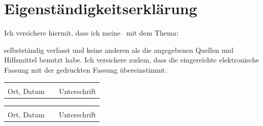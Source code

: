\section*{Eigenständigkeitserklärung}

\vspace{30pt}

\begin{flushleft}

Ich versichere hiermit, dass ich meine \artDerArbeit\ mit dem Thema: 

\textbf{\titel}

selbstständig verfasst und keine anderen als die angegebenen Quellen und Hilfsmittel benutzt habe. Ich versichere zudem, dass die eingereichte elektronische Fassung mit der gedruckten Fassung übereinstimmt.

\end{flushleft}


\vspace{30pt}


\begin{flushleft}
  \begin{tabular}{@{}p{6cm}p{1cm}p{6cm}@{}}
    \hrulefill & & \hrulefill \\
    \small Ort, Datum & & \small Unterschrift
  \end{tabular}
  \vspace{1em}
\end{flushleft}

\begin{flushleft}
  \begin{tabular}{@{}p{6cm}p{1cm}p{6cm}@{}}
    \hrulefill & & \hrulefill \\
    \small Ort, Datum & & \small Unterschrift
  \end{tabular}
  \vspace{1em}
\end{flushleft}

